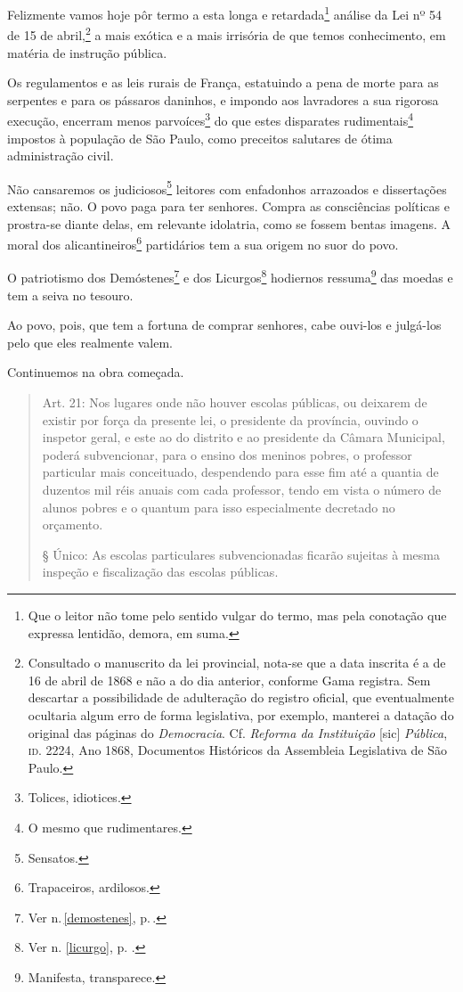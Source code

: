 Felizmente vamos hoje pôr termo a esta longa e retardada\footnote{Que
  o leitor não tome pelo sentido vulgar do termo, mas pela conotação que
  expressa lentidão, demora, em suma.} análise da Lei nº 54 de 15 de
abril,\footnote{Consultado o manuscrito da lei provincial, nota-se que
  a data inscrita é a de 16 de abril de 1868 e não a do dia anterior, conforme
  Gama registra. Sem descartar a possibilidade de adulteração do
  registro oficial, que eventualmente ocultaria algum erro de forma
  legislativa, por exemplo, manterei a datação do original das páginas
  do \emph{Democracia}. Cf. \emph{Reforma da Instituição} {[}sic{]}
  \emph{Pública}, \textsc{id}. 2224, Ano 1868, Documentos Históricos da
  Assembleia Legislativa de São Paulo.} a mais exótica e a mais
irrisória de que temos conhecimento, em matéria de instrução pública.

Os regulamentos e as leis rurais de França, estatuindo a pena de morte
para as serpentes e para os pássaros daninhos, e impondo aos lavradores
a sua rigorosa execução, encerram menos parvoíces\footnote{Tolices,
  idiotices.} do que estes disparates rudimentais\footnote{O mesmo que
  rudimentares.} impostos à população de São Paulo, como preceitos
salutares de ótima administração civil.

Não cansaremos os judiciosos\footnote{Sensatos.} leitores com
enfadonhos arrazoados e dissertações extensas; não. O povo paga para ter
senhores. Compra as consciências políticas e prostra-se diante delas, em
relevante idolatria, como se fossem bentas imagens. A moral dos
alicantineiros\footnote{Trapaceiros, ardilosos.} partidários tem a sua
origem no suor do povo.

O patriotismo dos Demóstenes\footnote{Ver n.\,\ref{demostenes}, p.\,\pageref{demostenes}.} e dos Licurgos\footnote{Ver n. 
  \ref{licurgo}, p. \pageref{licurgo}.} hodiernos ressuma\footnote{Manifesta, 
  transparece.} das moedas e tem a seiva no tesouro.

Ao povo, pois, que tem a fortuna de comprar senhores, cabe ouvi-los e
julgá-los pelo que eles realmente valem.

Continuemos na obra começada.

\begin{quote}
Art. 21: Nos lugares onde não houver escolas públicas, ou deixarem de
existir por força da presente lei, o presidente da província, ouvindo o
inspetor geral, e este ao do distrito e ao presidente da Câmara
Municipal, poderá subvencionar, para o ensino dos meninos pobres, o
professor particular mais conceituado, despendendo para esse fim até a
quantia de duzentos mil réis anuais com cada professor, tendo em vista o
número de alunos pobres e o quantum para isso especialmente decretado no
orçamento.

§ Único: As escolas particulares subvencionadas ficarão sujeitas à mesma
inspeção e fiscalização das escolas públicas.
\end{quote}

